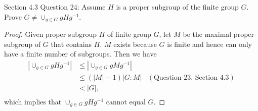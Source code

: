 Section 4.3 Question 24: Assume $H$ is a proper subgroup of the finite
group $G$. Prove $G\neq\cup_{g\in G}gHg^{-1}$.

\begin{proof}
  Given proper subgroup $H$ of finite group $G$, let $M$ be the maximal
  proper subgroup of $G$ that contains $H$. $M$ exists because $G$ is
  finite and hence can only have a finite number of subgroups. Then we have
  \begin{align*}
    |\cup_{g\in G}gHg^{-1}|  &\leq|\cup_{g\in G}gMg^{-1}| & \\
                             &\leq(|M|-1)|G:M|  & (\text{Question 23,
                              Section 4.3}) \\
                             &<|G|, & \\
  \end{align*}
  which implies that $\cup_{g\in G}gHg^{-1}$ cannot equal $G$.
\end{proof}
